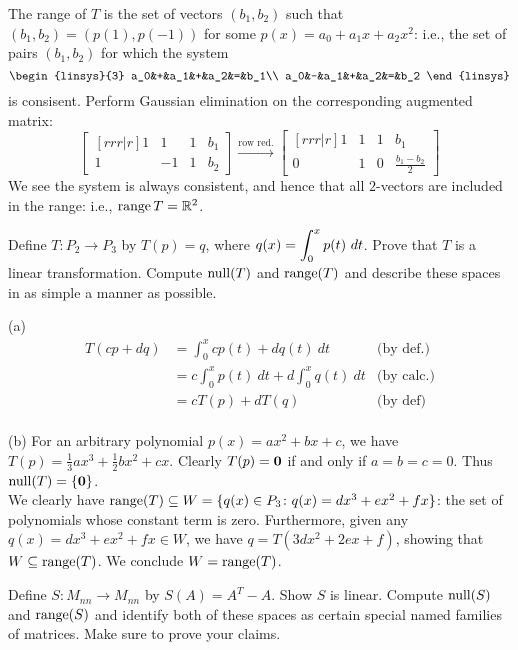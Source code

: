 \begin{solution}
\noindent
The range of $T$ is the set of vectors $(b_1,b_2)$ such that $(b_1,b_2)=(p(1),p(-1))$ for some $p(x)=a_0+a_1x+a_2x^2$: i.e., the set of pairs $(b_1,b_2)$ for which the system 
\[
\begin{linsys}{3}
a_0&+&a_1&+&a_2&=&b_1\\
a_0&-&a_1&+&a_2&=&b_2
\end{linsys}
\]
is consisent.  Perform Gaussian elimination on the corresponding augmented matrix:
\[
\begin{bmatrix}[rrr|r]
1&1&1&b_1\\
1&-1&1&b_2
\end{bmatrix}
\xrightarrow{\text{row red.}}
\begin{bmatrix}[rrr|r]
1&1&1&b_1\\
0&1&0&\frac{b_1-b_2}{2}
\end{bmatrix}
\]
We see the system is always consistent, and hence that all $2$-vectors are included in the range: i.e., $\operatorname{range} T={\mathbb R}^2$.  
\end{solution}
\vspace{.2in}
\ii Define $T\colon P_2\rightarrow P_3$ by $T(p)=q$, where $\displaystyle q(x)=\int_0^x p(t) \ dt$. 
\bb
\ii Prove that $T$ is a linear transformation. 
\ii Compute $\operatorname{null}(T)$ and $\operatorname{range}(T)$ and describe these spaces in as simple a manner as possible. 
\ee
\begin{solution}
\noindent 
(a) 
\begin{align*}
T(cp+dq)&=\int_0^x cp(t)+dq(t) \ dt &\text{(by def.)}\\
&=c\int_0^x p(t) \ dt+d\int_0^x q(t) \ dt &\text{(by calc.)}\\
&=cT(p)+dT(q) &\text{(by def)}
\end{align*}
\\
(b) For an arbitrary polynomial $p(x)=ax^2+bx+c$, we have $T(p)=\frac{1}{3}ax^3+\frac{1}{2}bx^2+cx$. Clearly $T(p)={\mathbf 0}$ if and only if $a=b=c=0$. Thus $\operatorname{null}(T)=\{{\mathbf 0}\}$. 
\\
We clearly have $\operatorname{range}(T)\subseteq W=\{q(x)\in P_3\colon q(x)=dx^3+ex^2+fx\}$: the set of polynomials whose constant term is zero. Furthermore, given any $q(x)=dx^3+ex^2+fx\in W$, we have $q=T(3dx^2+2ex+f)$, showing that $W\subseteq \operatorname{range}(T)$. We conclude $W=\operatorname{range}(T)$. 
\end{solution}
\ii Define $S\colon M_{nn}\rightarrow M_{nn}$ by $S(A)=A^T-A$. 
\bb
\ii Show $S$ is linear. 
\ii Compute $\operatorname{null}(S)$ and $\operatorname{range}(S)$ and identify both of these spaces as certain special named families of matrices. Make sure to prove your claims.   
